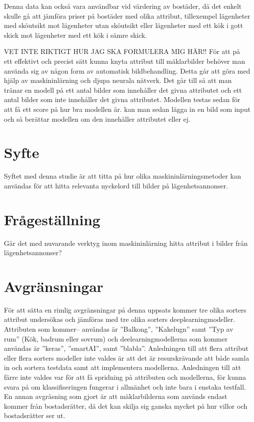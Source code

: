 \documentclass{kththesis}
\begin{document}
Denna data kan också vara användbar vid värdering av bostäder, då det enkelt skulle gå att jämföra priser på bostäder med olika attribut, tillexempel lägenheter med sköutsikt mot lägenheter utan sköutsikt eller lägenheter med ett kök i gott skick mot lägenheter med ett kök i sämre skick.

VET INTE RIKTIGT HUR JAG SKA FORMULERA MIG HÄR!!
För att på ett effektivt och precist sätt kunna knyta attribut till mäklarbilder behöver man använda sig av någon form av automatisk bildbehandling.
Detta går att göra med hjälp av maskininlärning och djupa neurala nätverk.
Det går till så att man tränar en modell på ett antal bilder som innehåller det givna attributet och ett antal bilder som inte innehåller det givna attributet.
Modellen testas sedan för att få ett score på hur bra modellen är.
 kan man sedan lägga in en bild som input och så berättar modellen om den innehåller attributet eller ej.
 



  \section{Syfte}
  Syftet med denna studie är att titta på hur olika maskininlärningsmetoder kan användas för att hitta relevanta nyckelord till bilder på lägenhetsannonser. 
  

  \section{Frågeställning}
  Går det med nuvarande verktyg inom maskininlärning hitta attribut i bilder från lägenhetsannonser?


  \section{Avgränsningar}
  För att sätta en rimlig avgränsningar på denna uppsats kommer tre olika sorters attribut undersökas och jämföras med tre olika sorters deeplearningmodeller. 
  Attributen som kommer– användas är ”Balkong”, ”Kakelugn” samt ”Typ av rum” (Kök, badrum eller sovrum) och deelearningmodellerna som kommer användas är ”keras”, ”smartAI”, samt ”blabla”. 
  Anledningen till att flera attribut eller flera sorters modeller inte valdes är att det är resurskrävande att både samla in och sortera testdata samt att implementera modellerna. 
  Anledningen till att färre inte valdes var för att få spridning på attributen och modellerna, för kunna svara på om klassifiseringen fungerar i allmänhet och inte bara i enstaka testfall. 
  En annan avgräsning som gjort är att mäklarbilderna som används endast kommer från bostadsrätter, då det kan skilja sig ganska mycket på hur villor och bostadsrätter ser ut.
\end{document}
